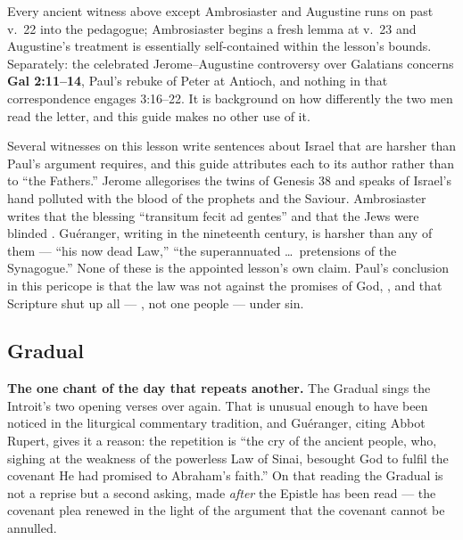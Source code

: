 \begin{witnessnote}
Every ancient witness above except Ambrosiaster and Augustine runs on past
v.~22 into the pedagogue; Ambrosiaster begins a fresh lemma at v.~23 and
Augustine's treatment is essentially self-contained within the lesson's
bounds. Separately: the celebrated Jerome--Augustine controversy over
Galatians concerns \textbf{Gal 2:11--14}, Paul's rebuke of Peter at Antioch,
and nothing in that correspondence engages 3:16--22. It is background on how
differently the two men read the letter, and this guide makes no other use of
it.
\end{witnessnote}

\begin{witnessnote}
Several witnesses on this lesson write sentences about Israel that are harsher
than Paul's argument requires, and this guide attributes each to its author
rather than to ``the Fathers.'' Jerome allegorises the twins of Genesis 38 and
speaks of Israel's hand polluted with the blood of the prophets and the
Saviour. Ambrosiaster writes that the blessing ``transitum fecit ad gentes''
and that the Jews were blinded . Guéranger, writing
in the nineteenth century, is harsher than any of them --- ``his now dead
Law,'' ``the superannuated \dots\ pretensions of the Synagogue.'' None of these
is the appointed lesson's own claim. Paul's conclusion in this pericope is that
the law was not against the promises of God, , and that Scripture
shut up all --- , not one people --- under sin.
\end{witnessnote}

\elementguard
\subsection*{Gradual }


\textbf{The one chant of the day that repeats another.} The Gradual sings the
Introit's two opening verses over again. That is unusual enough to have been
noticed in the liturgical commentary tradition, and Guéranger, citing Abbot
Rupert, gives it a reason: the repetition is ``the cry of the ancient people,
who, sighing at the weakness of the powerless Law of Sinai, besought God to
fulfil the covenant He had promised to Abraham's faith.'' On that reading the
Gradual is not a reprise but a second asking, made \textit{after} the Epistle
has been read --- the covenant plea renewed in the light of the argument that
the covenant cannot be annulled.

